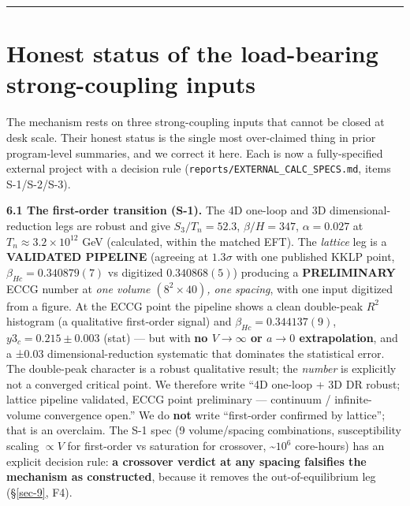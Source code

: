 \documentclass[aps,prd,preprint,nofootinbib,superscriptaddress]{revtex4-2}
\begin{document}
\begin{center}\rule{0.5\linewidth}{0.5pt}\end{center}

\section{Honest status of the load-bearing strong-coupling
inputs}\label{sec-6}

The mechanism rests on three strong-coupling inputs that cannot be
closed at desk scale. Their honest status is the single most
over-claimed thing in prior program-level summaries, and we correct it
here. Each is now a fully-specified external project with a decision
rule (\texttt{reports/\allowbreak EXTERNAL\_\allowbreak CALC\_\allowbreak SPECS.\allowbreak md}, items S-1/S-2/S-3).

\textbf{6.1 The first-order transition (S-1).} The 4D one-loop and 3D
dimensional-reduction legs are robust and give \(S_3/T_n = 52.3\),
\(\beta/H = 347\), \(\alpha = 0.027\) at
\(T_n \approx 3.2\times10^{12}\) GeV (calculated, within the matched
EFT). The \emph{lattice} leg is a \textbf{VALIDATED PIPELINE} (agreeing
at \(1.3\sigma\) with one published KKLP point,
\(\beta_{Hc} = 0.340879(7)\) vs digitized \(0.340868(5)\)) producing a
\textbf{PRELIMINARY} ECCG number at \emph{one volume
\((8^{2}\times 40)\), one spacing}, with one input digitized from a
figure. At the ECCG point the pipeline shows a clean double-peak
\(R^{2}\) histogram (a qualitative first-order signal) and
\(\beta_{Hc} = 0.344137(9)\), \(y3_c = 0.215 \pm 0.003\) (stat) --- but
with \textbf{no \(V \to \infty\) or \(a \to 0\) extrapolation}, and a
±0.03 dimensional-reduction systematic that dominates the statistical
error. The double-peak character is a robust qualitative result; the
\emph{number} is explicitly not a converged critical point. We therefore
write ``4D one-loop + 3D DR robust; lattice pipeline validated, ECCG
point preliminary --- continuum / infinite-volume convergence open.'' We
do \textbf{not} write ``first-order confirmed by lattice''; that is an
overclaim. The S-1 spec (9 volume/spacing combinations, susceptibility
scaling \(\propto V\) for first-order vs saturation for crossover,
\textasciitilde{}\(10^{6}\) core-hours) has an explicit decision rule:
\textbf{a crossover verdict at any spacing falsifies the mechanism as
constructed}, because it removes the out-of-equilibrium leg
(§\ref{sec-9}, F4).
\end{document}
